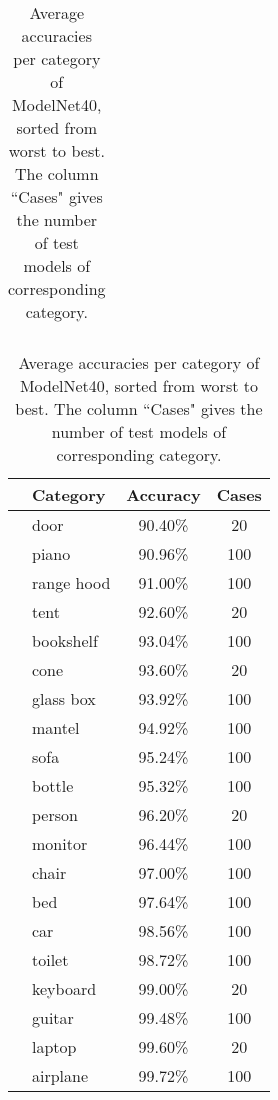 \begin{table}[]
\begin{tabular}[t]{lccl}
	\end{tabular}
	\begin{tabular}[t]{llcc}
		\hline
		\hspace{4pt} & \textbf{Category} & \textbf{Accuracy} & \textbf{Cases} \\ \hline
		             & door              & 90.40\%           & 20             \\
		             & piano             & 90.96\%           & 100            \\
		             & range hood        & 91.00\%           & 100            \\
		             & tent              & 92.60\%           & 20             \\
		             & bookshelf         & 93.04\%           & 100            \\
		             & cone              & 93.60\%           & 20             \\
		             & glass box         & 93.92\%           & 100            \\
		             & mantel            & 94.92\%           & 100            \\
		             & sofa              & 95.24\%           & 100            \\
		             & bottle            & 95.32\%           & 100            \\
		             & person            & 96.20\%           & 20             \\
		             & monitor           & 96.44\%           & 100            \\
		             & chair             & 97.00\%           & 100            \\
		             & bed               & 97.64\%           & 100            \\
		             & car               & 98.56\%           & 100            \\
		             & toilet            & 98.72\%           & 100            \\
		             & keyboard          & 99.00\%           & 20             \\
		             & guitar            & 99.48\%           & 100            \\
		             & laptop            & 99.60\%           & 20             \\
		             & airplane          & 99.72\%           & 100            \\ \hline
	\end{tabular}

	\caption{Average accuracies per category of ModelNet40, sorted from worst to best. The column ``Cases" gives the number of test models of corresponding category.}
	\label{Table:cataccuracies}
\end{table}